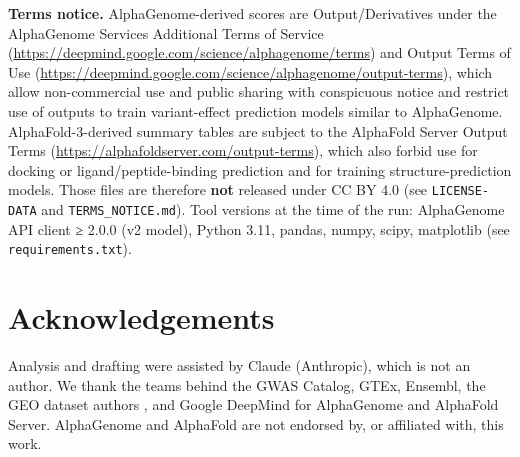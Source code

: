 \documentclass[10pt,twocolumn,a4paper]{article}
\begin{document}
\textbf{Terms notice.} AlphaGenome-derived scores are Output/Derivatives under the AlphaGenome Services Additional Terms of Service (\url{https://deepmind.google.com/science/alphagenome/terms}) and Output Terms of Use (\url{https://deepmind.google.com/science/alphagenome/output-terms}), which allow non-commercial use and public sharing with conspicuous notice and restrict use of outputs to train variant-effect prediction models similar to AlphaGenome. AlphaFold-3-derived summary tables are subject to the AlphaFold Server Output Terms (\url{https://alphafoldserver.com/output-terms}), which also forbid use for docking or ligand/peptide-binding prediction and for training structure-prediction models. Those files are therefore \textbf{not} released under CC BY 4.0 (see \texttt{LICENSE-DATA} and \texttt{TERMS\_NOTICE.md}). Tool versions at the time of the run: AlphaGenome API client ≥ 2.0.0 (v2 model), Python 3.11, pandas, numpy, scipy, matplotlib (see \texttt{requirements.txt}).

\section{Acknowledgements}

Analysis and drafting were assisted by Claude (Anthropic), which is not an author. We thank the teams behind the GWAS Catalog, GTEx, Ensembl, the GEO dataset authors \cite{k20}, and Google DeepMind for AlphaGenome and AlphaFold Server. AlphaGenome and AlphaFold are not endorsed by, or affiliated with, this work.
\end{document}
